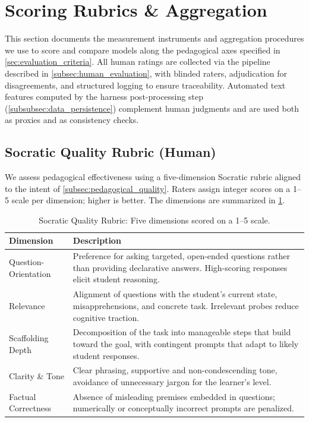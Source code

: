\section{Scoring Rubrics \& Aggregation}\label{sec:scoring_rubrics}

This section documents the measurement instruments and aggregation procedures we use to score and compare models along the pedagogical axes specified in \cref{sec:evaluation_criteria}. All human ratings are collected via the pipeline described in \cref{subsec:human_evaluation}, with blinded raters, adjudication for disagreements, and structured logging to ensure traceability. Automated text features computed by the harness post-processing step (\cref{subsubsec:data_persistence}) complement human judgments and are used both as proxies and as consistency checks.

\subsection{Socratic Quality Rubric (Human)}\label{subsec:socratic_quality_rubric}

We assess pedagogical effectiveness using a five-dimension Socratic rubric aligned to the intent of \cref{subsec:pedagogical_quality}. Raters assign integer scores on a 1--5 scale per dimension; higher is better. The dimensions are summarized in \cref{tab:socratic_dimensions}.

\begin{table}[t]
\centering
\caption{Socratic Quality Rubric: Five dimensions scored on a 1--5 scale.}
\label{tab:socratic_dimensions}
\begin{tabularx}{\textwidth}{@{}l X@{}}
\toprule
\textbf{Dimension} & \textbf{Description} \\ \midrule
Question-Orientation & Preference for asking targeted, open-ended questions rather than providing declarative answers. High-scoring responses elicit student reasoning. \\
Relevance & Alignment of questions with the student's current state, misapprehensions, and concrete task. Irrelevant probes reduce cognitive traction. \\
Scaffolding Depth & Decomposition of the task into manageable steps that build toward the goal, with contingent prompts that adapt to likely student responses. \\
Clarity \& Tone & Clear phrasing, supportive and non-condescending tone, avoidance of unnecessary jargon for the learner's level. \\
Factual Correctness & Absence of misleading premises embedded in questions; numerically or conceptually incorrect prompts are penalized. \\ \bottomrule
\end{tabularx}
\end{table}

